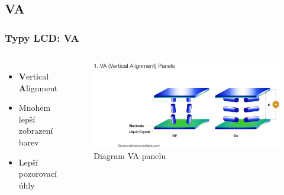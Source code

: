 \documentclass[aspectratio=169,11pt, allowframebreak=0.9]{beamer}
\begin{document}
    \subsection{VA}
    \begin{frame}
    \frametitle{Typy LCD: VA}
    \begin{columns}
    \begin{itemize}
        \item \textbf{V}ertical \textbf{A}lignment
        \item Mnohem lepší zobrazení barev
        \item Lepší pozorovací úhly
    \end{itemize}
    \begin{figure}
        \centering
        \includegraphics[width=1\textwidth]{va}
        \caption{Diagram VA panelu}
    \end{figure}
    \end{columns}
    \end{frame}
\end{document}
